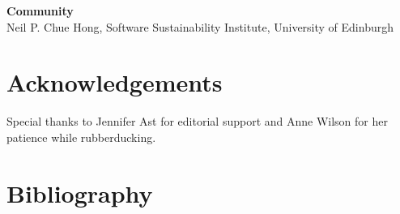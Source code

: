 \documentclass{article}
\begin{document}
\textbf{Community}\\
Neil P. Chue Hong, Software Sustainability Institute, University of Edinburgh

\section{Acknowledgements}
Special thanks to Jennifer Ast for editorial support and Anne Wilson for her patience while rubberducking. 

\section{Bibliography}
\nocite{*}
\printbibliography
\end{document}

